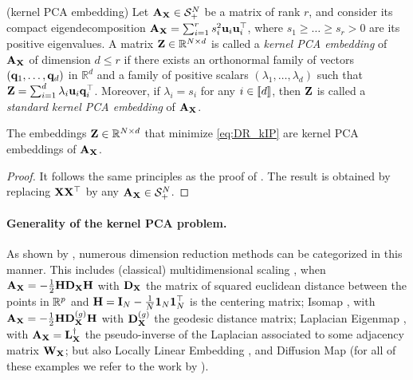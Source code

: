 \begin{definition}{(kernel PCA embedding)}
    Let ${\mathbf{A}}_{{\mathbf{X}}} \in \mathcal{S}^N_{+}$ be a matrix of rank $r$, and consider its compact eigendecomposition ${\mathbf{A}}_{{\mathbf{X}}} = \sum_{i=1}^{r} s_i^2 {\mathbf{u}}_i {\mathbf{u}}_i^\top$, where $s_1 \geq \dots \geq s_r > 0$ are its positive eigenvalues. A matrix ${\mathbf{Z}} \in \mathbb{R}^{N \times d}$ is called a \emph{kernel PCA embedding} of ${\mathbf{A}}_{{\mathbf{X}}}$ of dimension $d \leq r$ if there exists an orthonormal family of vectors $({\mathbf{q}}_1, \dots, {\mathbf{q}}_d)$ in $\mathbb{R}^d$ and a family of positive scalars $(\lambda_1, \dots, \lambda_d)$ such that ${\mathbf{Z}} = \sum_{i=1}^{d} \lambda_i {\mathbf{u}}_i {\mathbf{q}}_i^\top$. Moreover, if $\lambda_i = s_i$ for any $i \in {[\![d]\!]}$, then ${\mathbf{Z}}$ is called a \emph{standard kernel PCA embedding} of ${\mathbf{A}}_{{\mathbf{X}}}$.
\end{definition}


\begin{proposition}
    The embeddings ${\mathbf{Z}} \in \mathbb{R}^{N \times d}$ that minimize \ref{eq:DR_kIP} are kernel PCA embeddings of ${\mathbf{A}}_{{\mathbf{X}}}$.
\end{proposition}


\begin{proof}
	It follows the same principles as the proof of . The result is obtained by replacing ${\mathbf{X}} {\mathbf{X}}^\top$ by any ${\mathbf{A}}_{{\mathbf{X}}} \in \mathcal{S}^N_{+}$.
\end{proof}

\paragraph{Generality of the kernel PCA problem.}
As shown by \citet{ham2004kernel, ghojogh2021unified}, numerous dimension reduction methods can be categorized in this manner.
This includes 
(classical) multidimensional scaling \citep{borg2005modern}, when ${\mathbf{A}}_{{\mathbf{X}}} = -\frac{1}{2} {\mathbf{H}} {\mathbf{D}}_{\mathbf{X}} {\mathbf{H}}$ with ${\mathbf{D}}_{\mathbf{X}}$ the matrix of squared euclidean distance between the points in $\mathbb{R}^{p}$ and ${\mathbf{H}} = {\mathbf{I}}_N - \frac{1}{N} \bm{1}_N \bm{1}_N^\top$ is the centering matrix; Isomap \citep{tenenbaum2000global}, with ${\mathbf{A}}_{{\mathbf{X}}} = -\frac{1}{2} {\mathbf{H}} {\mathbf{D}}_{\mathbf{X}}^{(g)} {\mathbf{H}}$ with ${\mathbf{D}}_{\mathbf{X}}^{(g)}$ the geodesic distance matrix; Laplacian Eigenmap
\citep{belkin2003laplacian}, with ${\mathbf{A}}_{{\mathbf{X}}} = {\mathbf{L}}_{\mathbf{X}}^{\dagger}$ the pseudo-inverse of the Laplacian associated to some adjacency matrix ${\mathbf{W}}_{\mathbf{X}}$; but also Locally Linear Embedding \citep{roweis2000nonlinear}, and Diffusion Map \citep{coifman2006diffusion} (for all of these examples we refer to the work by \citealt[Table 1]{ghojogh2021unified}).
